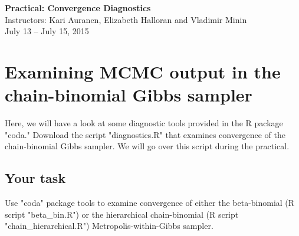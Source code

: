 \documentclass[11pt]{article}
\numberwithin{algorithm}{section}
\theoremstyle{remark}
\theoremstyle{definition}
\numberwithin{equation}{section}
\numberwithin{figure}{section}
\begin{document}


\begin{center}
  \textbf{\Large Practical: Convergence Diagnostics}\\
  {\large Instructors: Kari Auranen, Elizabeth Halloran and Vladimir Minin}\\
  {\large July 13 -- July 15, 2015}
\end{center}

\section*{Examining MCMC output in the chain-binomial Gibbs sampler}
Here, we will have a look at some diagnostic tools provided in the R package "coda." Download the script "diagnostics.R" that examines convergence of the chain-binomial Gibbs sampler.  We will go over this script during the practical. 

\subsection*{Your task}
Use "coda" package tools to examine convergence of either the beta-binomial (R script "beta\_bin.R") or the hierarchical chain-binomial (R script "chain\_hierarchical.R") Metropolis-within-Gibbs sampler. 
\end{document}
